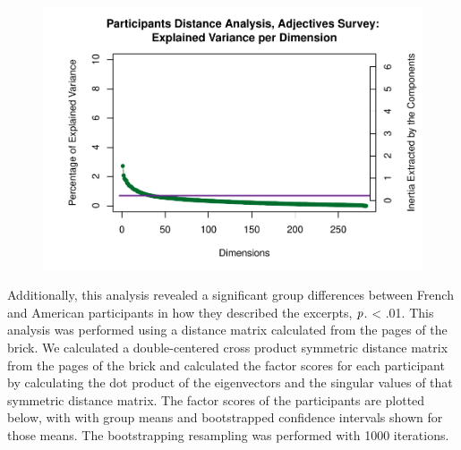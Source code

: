 \documentclass[
  english,
  man,floatsintext]{apa6}
\begin{document}
\begin{figure}

{\centering \includegraphics{Music-Descriptor-Space_files/figure-latex/unnamed-chunk-1-1} 

}

\caption{ }\label{fig:unnamed-chunk-1}
\end{figure}

Additionally, this analysis revealed a significant group differences between French and American participants in how they described the excerpts, \(\textit p\). \textless{} .01. This analysis was performed using a distance matrix calculated from the pages of the brick. We calculated a double-centered cross product symmetric distance matrix from the pages of the brick and calculated the factor scores for each participant by calculating the dot product of the eigenvectors and the singular values of that symmetric distance matrix. The factor scores of the participants are plotted below, with with group means and bootstrapped confidence intervals shown for those means. The bootstrapping resampling was performed with 1000 iterations.
\end{document}
